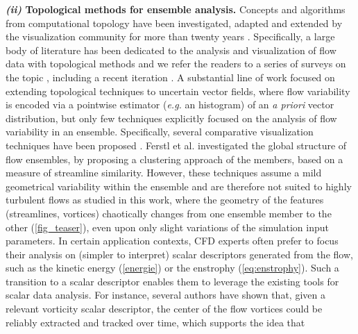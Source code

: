 \noindent
\textbf{\emph{(ii)} Topological methods for ensemble analysis.}
Concepts and algorithms from computational topology \cite{edelsbrunner09} have
been investigated, adapted and extended by the visualization community for more
than twenty years \cite{heine16}. Specifically, a large body of literature has
been dedicated to the analysis and visualization of flow data with
topological methods and we refer the readers to a series of surveys on the topic
\cite{ScheuermannT05, GarthT06,
LarameeHZP07, PobitzerPFSKTMH11,
wang2016,
BujackYHGW20},
including a
recent iteration \cite{flowIntro21}.
A substantial line of work
\cite{petz, otto2, otto1} focused on extending topological techniques to
uncertain vector fields, where flow variability is encoded via a pointwise
estimator (\emph{e.g.} an histogram) of an \emph{a priori} vector distribution, but only few
techniques explicitly focused on the analysis of flow variability in an
ensemble.
Specifically, several comparative visualization techniques have been
proposed \cite{filip3, schneider2012,Hummel2013, GuoHPSCH16, JaremaKW16, filip2, filip1, LohfinkG20}. Ferstl et al.
\cite{Ferstl2016} investigated the global structure of flow ensembles, by
proposing a  clustering approach of the  members, based on a measure of
streamline similarity.
However, these techniques assume a mild
geometrical variability within the ensemble and are therefore
not suited to highly
turbulent flows as studied in this work, where the geometry of the features
(streamlines, vortices) chaotically changes from one ensemble
member to the other (\autoref{fig_teaser}), even upon only slight variations of
the simulation input parameters.
In certain application contexts, CFD experts often prefer to focus their analysis on (simpler to interpret) scalar descriptors generated from the flow, such as the kinetic energy (\autoref{energie}) or the enstrophy (\autoref{eq:enstrophy}). Such a transition to a scalar descriptor enables them to leverage the existing tools for scalar data analysis.
For instance, several
authors \cite{kasten_tvcg11, bridel_ldav19} have shown that, given a relevant
vorticity scalar descriptor, the center of the flow vortices could be reliably
extracted and tracked over time, which supports the idea that
